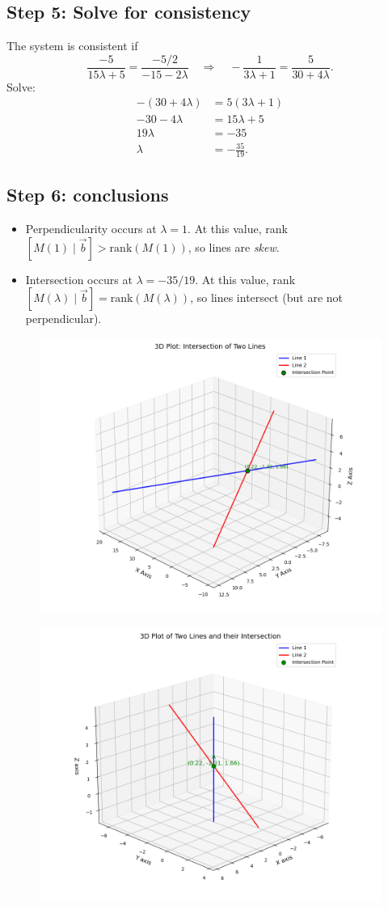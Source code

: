 \documentclass[journal]{IEEEtran}
\begin{document}
\subsection*{Step 5: Solve for consistency}
The system is consistent if
\[
\frac{-5}{15\lambda+5} = \frac{-5/2}{-15-2\lambda} \quad \Longrightarrow \quad -\frac{1}{3\lambda+1} = \frac{5}{30+4\lambda}.
\]
Solve:
\begin{align}
-(30+4\lambda) &= 5(3\lambda+1) \\
-30-4\lambda &= 15\lambda + 5 \\
19\lambda &= -35 \\
\boxed{\lambda} &= -\frac{35}{19}.
\end{align}

\subsection*{Step 6: conclusions}
\begin{itemize}
\item Perpendicularity occurs at \(\lambda=1\). At this value, rank\([M(1)\mid \vec b] > \text{rank}(M(1))\), so lines are \emph{skew}.
\item Intersection occurs at \(\lambda=-35/19\). At this value, rank\([M(\lambda)\mid \vec b] = \text{rank}(M(\lambda))\), so lines intersect (but are not perpendicular).
\end{itemize}
\begin{figure}[h]
    \centering
    \includegraphics[width=0.9\columnwidth]{figs/fig71.png}
    \caption{}
    \label{fig:placeholder}
\end{figure}
\begin{figure}
    \centering
    \includegraphics[width=0.9\columnwidth]{figs/fig72.png}
    \caption{}
    \label{fig:placeholder}
\end{figure}
\end{document}
